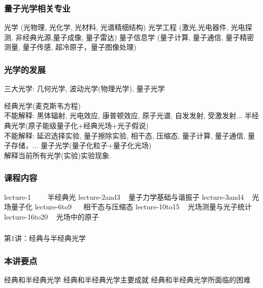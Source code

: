 \begin{frame}
      \frametitle{量子光学相关专业}
      \begin{itemize}
        \Item 光学 (光物理, 光化学, 光材料, 光谱精细结构)
        \Item 光学工程 (激光,光电器件, 光电探测, 非经典光源,量子成像, 量子雷达)  
        \Item 量子信息学 (量子计算, 量子通信, 量子精密测量, 量子传感,  超冷原子，量子图像处理)    
    \end{itemize}  
\end{frame}

\begin{frame}
    \frametitle{光学的发展}
    三大光学: 几何光学, 波动光学(物理光学), 量子光学
    \begin{itemize}
        \Item 经典光学(麦克斯韦方程) \\
        不能解释: 黑体辐射, 光电效应, 康普顿效应, 原子光谱, 自发发射, 受激发射...
        \pause
        \Item 半经典光学(原子能级量子化+经典光场+光子假说)  \\
        不能解释: 延迟选择实验, 量子擦除实验, 相干态, 压缩态, 量子计算, 量子通信, 量子存储，...
        \pause
        \Item 量子光学(量子化粒子+量子化光场)  \\
        解释当前所有光学(实验)实验现象. 
    \end{itemize}     
\end{frame}

\begin{frame}
    \frametitle{课程内容}
        \begin{enumerate}
            \Item lecture-1   ~~~~半经典光
            \Item lecture-2and3 ~ 量子力学基础与谐振子
            \Item lecture-3and4 ~ 光场量子化
            \Item lecture-6to9  ~~ 相干态与压缩态
            \Item lecture-10to15 ~ 光场测量与光子统计
            \Item lecture-16to20 ~ 光场中的原子
        \end{enumerate}
  \end{frame}

\begin{frame} [plain]
    \frametitle{}
    \Background[1] 
    \begin{center}
    {\huge 第1讲：经典与半经典光学}
    \end{center}  
    \addtocounter{framenumber}{-1}   
\end{frame}

\begin{frame}
      \frametitle{本讲要点}
      \begin{enumerate}
        \Item 经典和半经典光学
        \Item 经典和半经典光学主要成就
        \Item 经典和半经典光学所面临的困难
    \end{enumerate}
      
\end{frame}

